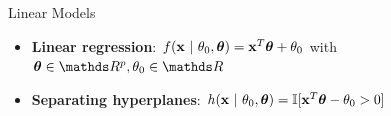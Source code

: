 \documentclass[11pt,compress,t,notes=noshow, xcolor=table]{beamer}
\begin{document}
\begin{vbframe}{Linear Models}

\begin{itemize}

  \item \textbf{Linear regression}: $f(\mathbf{x} ~|~ \theta_0, \bm{\theta}) = \mathbf{x}^T\bm{\theta} + \theta_0$ with $\bm{\theta} \in \R^p, \theta_0 \in \R$
  \begin{figure}
    \centering
  \end{figure}

  \item \textbf{Separating hyperplanes}: $h(\mathbf{x} ~|~ \theta_0, \bm{\theta}) = \mathbb{I}[\mathbf{x}^T\bm{\theta} - \theta_0 > 0]$%
  \begin{figure}
    \centering
  \end{figure}
  \end{itemize}
\end{vbframe}
\end{document}
